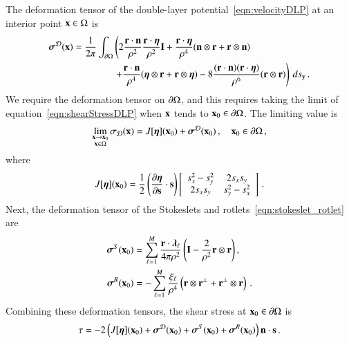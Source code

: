 \documentclass[preprint, 10pt]{elsarticle}
\begin{document}
The deformation tensor of the double-layer potential~\eqref{eqn:velocityDLP} at an interior point ${\mathbf{x}} \in \Omega$ is~\cite{qua-bir2014a}
\begin{equation}
  \label{eqn:shearStressDLP}
  \begin{aligned}
  {\boldsymbol\sigma}^{\mathcal{D}}({\mathbf{x}}) = \frac{1}{2\pi}\int_{{\partial}\Omega} &\left(
    2\frac{{\mathbf{r}} \cdot {\mathbf{n}}}{\rho^2} \frac{{\mathbf{r}} \cdot {\boldsymbol\eta}}{\rho^2} {\mathbf{I}} + 
    \frac{{\mathbf{r}} \cdot {\boldsymbol\eta}}{\rho^4} ({\mathbf{n}} \otimes {\mathbf{r}} + {\mathbf{r}} \otimes {\mathbf{n}}) 
    \right. \\
    &\left.
    +\frac{{\mathbf{r}} \cdot {\mathbf{n}}}{\rho^4} ({\boldsymbol\eta} \otimes {\mathbf{r}} + {\mathbf{r}} \otimes {\boldsymbol\eta}) - 
    8\frac{({\mathbf{r}} \cdot {\mathbf{n}})({\mathbf{r}} \cdot {\boldsymbol\eta})}{\rho^6}({\mathbf{r}} \otimes {\mathbf{r}})
  \right) \, ds_{\mathbf{y}} \, .
  \end{aligned}
\end{equation}
We require the deformation tensor on ${\partial}\Omega$, and this requires taking the limit of equation~\eqref{eqn:shearStressDLP} when ${\mathbf{x}}$ tends to ${\mathbf{x}}_0 \in {\partial}\Omega$.  The limiting value is
\begin{align}
  \lim_{\substack{{\mathbf{x}} \rightarrow {\mathbf{x}}_0 \\ {\mathbf{x}} \in \Omega}}\sigma_{\mathcal{D}}({\mathbf{x}}) =
  J[{\boldsymbol\eta}]({\mathbf{x}}_0) + {\boldsymbol\sigma}^{\mathcal{D}}({\mathbf{x}}_0)\, , \quad {\mathbf{x}}_0 \in {\partial}\Omega \, ,
\end{align} 
where
\begin{align}
  J[{\boldsymbol\eta}]({\mathbf{x}}_0) = \frac{1}{2}\left(\frac{\partial {\boldsymbol\eta}}{\partial {\mathbf{s}}} 
    \cdot {\mathbf{s}}\right) \left[ 
  \begin{array}{cc}
    s_x^2 - s_y^2 & 2s_x s_y \\ 2s_x s_y & s_y^2 - s_x^2
  \end{array}\right] \, .
  \label{eqn:shearStressJump}
\end{align}
Next, the deformation tensor of the Stokeslets and rotlets~\eqref{eqn:stokeslet_rotlet} are
\begin{equation}
  \label{eqn:shearStressSR}
  \begin{aligned}
  {\boldsymbol\sigma}^S({\mathbf{x}}_0) &= \sum_{\ell=1}^{M}
    \frac{{\mathbf{r}} \cdot {\boldsymbol\lambda}_\ell}{4\pi\rho^2} \left(
    {\mathbf{I}} - \frac{2}{\rho^2} {\mathbf{r}} \otimes {\mathbf{r}} \right),  \\
  {\boldsymbol\sigma}^R({\mathbf{x}}_0) &= -\sum_{\ell=1}^M
    \frac{\xi_\ell}{\rho^4} \left({\mathbf{r}} \otimes {\mathbf{r}}^\perp + 
    {\mathbf{r}}^\perp \otimes {\mathbf{r}} \right) \, .
  \end{aligned}
\end{equation}
Combining these deformation tensors, the shear stress at ${\mathbf{x}}_0 \in {\partial}\Omega$ is
\begin{align}
  \tau = -2 \left(J[{\boldsymbol\eta}]({\mathbf{x}}_0) + {\boldsymbol\sigma}^{\mathcal{D}}({\mathbf{x}}_0) + 
    {\boldsymbol\sigma}^S({\mathbf{x}}_0) + {\boldsymbol\sigma}^R({\mathbf{x}}_0)\right) {\mathbf{n}} \cdot {\mathbf{s}} \, .
  \label{eqn:shearStressLP}
\end{align}
\end{document}

